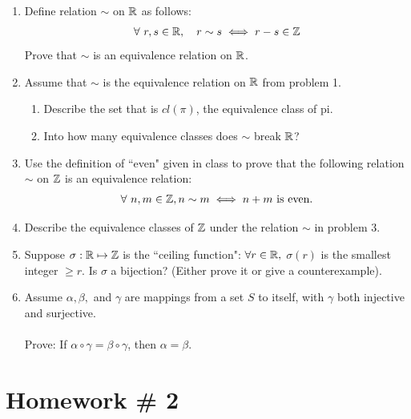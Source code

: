 \begin{enumerate}
    \item Define relation $\sim$ on ${\mathbb{ R}}$ as follows:
    \begin{align}
        \forall \ r,s \in {\mathbb{ R}}, \ \ \ r\sim s \iff r-s\in {\mathbb{ Z}} \nonumber
    \end{align}
    Prove that $\sim$ is an equivalence relation on ${\mathbb{ R}}$. \\ \steezybreak

    \item Assume that $\sim$ is the equivalence relation on ${\mathbb{ R}}$ from problem 1.
    \begin{enumerate}[label=\alph*)]
        \item Describe the set that is $cl(\pi)$, the equivalence class of pi.
        \item Into how many equivalence classes does $\sim$ break ${\mathbb{ R}}$? \\ \steezybreak
        
    \end{enumerate}
    \item Use the definition of ``even" given in class to prove that the following relation $\sim$ on ${\mathbb{ Z}}$ is an equivalence relation:
    \begin{align}
        \forall \ n,m \in {\mathbb{ Z}}, n\sim m \iff n+m \text{ is even.}\nonumber
    \end{align}
    \item Describe the equivalence classes of ${\mathbb{ Z}}$ under the relation $\sim$ in problem 3. \\ \steezybreak
    
    \item Suppose $\sigma : {\mathbb{ R}} \mapsto {\mathbb{ Z}}$ is the ``ceiling function": $\forall r\in {\mathbb{ R}},$ $\sigma(r)$ is the smallest integer $\geq r$. Is $\sigma$ a bijection? (Either prove it or give a counterexample). \\ \steezybreak
    
    \item Assume $\alpha, \beta,$ and $\gamma$ are mappings from a set $S$ to itself, with $\gamma$ both injective and surjective. \\ \\
    Prove: If $\alpha \circ \gamma = \beta \circ \gamma$, then $\alpha = \beta$.
\end{enumerate}
\newpage

\section*{Homework \# 2}
\label{sec:HW2}

